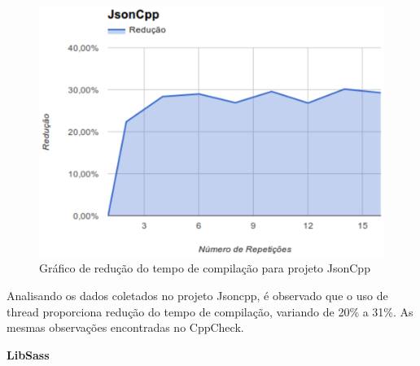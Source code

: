 \begin{figure}[h]
    \centering
        \includegraphics[keepaspectratio=true,scale=1]{figuras/jsoncpp.eps}
    \caption{Gráfico de redução do tempo de compilação para projeto JsonCpp}
    \label{jsoncpp}
\end{figure}

Analisando os dados coletados no projeto Jsoncpp, é observado
 que o uso de thread proporciona
 redução do tempo de compilação, variando de 20\% a 31\%.
As mesmas observações encontradas no CppCheck.

\textbf{LibSass}

